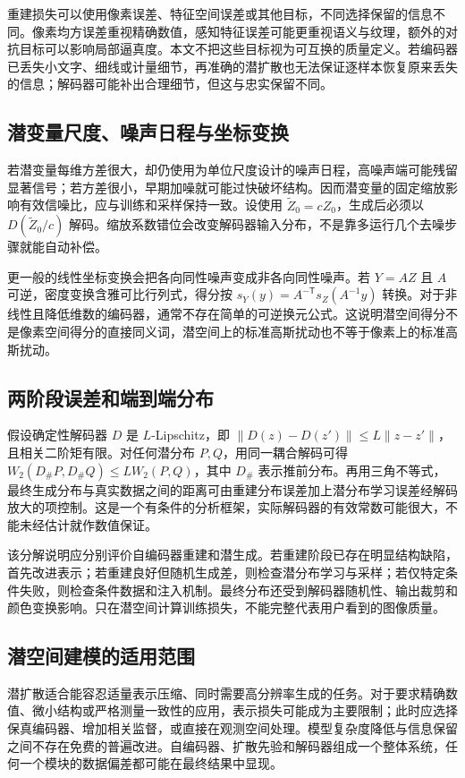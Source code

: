 \documentclass[UTF8,12pt,a4paper,fontset=fandol]{ctexart}
\begin{document}
重建损失可以使用像素误差、特征空间误差或其他目标，不同选择保留的信息不同。像素均方误差重视精确数值，感知特征误差可能更重视语义与纹理，额外的对抗目标可以影响局部逼真度。本文不把这些目标视为可互换的质量定义。若编码器已丢失小文字、细线或计量细节，再准确的潜扩散也无法保证逐样本恢复原来丢失的信息；解码器可能补出合理细节，但这与忠实保留不同。

\subsection{潜变量尺度、噪声日程与坐标变换}
若潜变量每维方差很大，却仍使用为单位尺度设计的噪声日程，高噪声端可能残留显著信号；若方差很小，早期加噪就可能过快破坏结构。因而潜变量的固定缩放影响有效信噪比，应与训练和采样保持一致。设使用 $\widetilde Z_0=cZ_0$，生成后必须以 $D(\widetilde Z_0/c)$ 解码。缩放系数错位会改变解码器输入分布，不是靠多运行几个去噪步骤就能自动补偿。

更一般的线性坐标变换会把各向同性噪声变成非各向同性噪声。若 $Y=AZ$ 且 $A$ 可逆，密度变换含雅可比行列式，得分按 $s_Y(y)=A^{-\mathsf T}s_Z(A^{-1}y)$ 转换。对于非线性且降低维数的编码器，通常不存在简单的可逆换元公式。这说明潜空间得分不是像素空间得分的直接同义词，潜空间上的标准高斯扰动也不等于像素上的标准高斯扰动。

\subsection{两阶段误差和端到端分布}
假设确定性解码器 $D$ 是 $L$-Lipschitz，即 $\|D(z)-D(z')\|\leq L\|z-z'\|$，且相关二阶矩有限。对任何潜分布 $P,Q$，用同一耦合解码可得 $W_2(D_\#P,D_\#Q)\leq L W_2(P,Q)$，其中 $D_\#$ 表示推前分布。再用三角不等式，最终生成分布与真实数据之间的距离可由重建分布误差加上潜分布学习误差经解码放大的项控制。这是一个有条件的分析框架，实际解码器的有效常数可能很大，不能未经估计就作数值保证。

该分解说明应分别评价自编码器重建和潜生成。若重建阶段已存在明显结构缺陷，首先改进表示；若重建良好但随机生成差，则检查潜分布学习与采样；若仅特定条件失败，则检查条件数据和注入机制。最终分布还受到解码器随机性、输出裁剪和颜色变换影响。只在潜空间计算训练损失，不能完整代表用户看到的图像质量。

\subsection{潜空间建模的适用范围}
潜扩散适合能容忍适量表示压缩、同时需要高分辨率生成的任务。对于要求精确数值、微小结构或严格测量一致性的应用，表示损失可能成为主要限制；此时应选择保真编码器、增加相关监督，或直接在观测空间处理。模型复杂度降低与信息保留之间不存在免费的普遍改进。自编码器、扩散先验和解码器组成一个整体系统，任何一个模块的数据偏差都可能在最终结果中显现。
\end{document}
